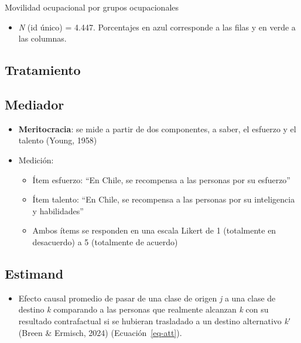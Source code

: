 \documentclass[
  spanish,
  letterpaper,
  DIV=11,
  numbers=noendperiod,
  oneside]{scrartcl}
\providecommand{\tightlist}{%
  \setlength{\itemsep}{0pt}\setlength{\parskip}{0pt}}
\begin{document}
\begin{table}

\caption{\label{tbl-ocup}Movilidad ocupacional por grupos ocupacionales}

\centering{

}

\end{table}%

\begin{itemize}
\tightlist
\item
  \emph{N} (id único) = 4.447. Porcentajes en azul corresponde a las
  filas y en verde a las columnas.
\end{itemize}

\subsection{Tratamiento}\label{tratamiento-2}

\subsection{Mediador}\label{mediador}

\begin{itemize}
\item
  \textbf{Meritocracia}: se mide a partir de dos componentes, a saber,
  el esfuerzo y el talento (Young, 1958)
\item
  Medición:

  \begin{itemize}
  \tightlist
  \item
    Ítem esfuerzo: ``En Chile, se recompensa a las personas por su
    esfuerzo''
  \item
    Ítem talento: ``En Chile, se recompensa a las personas por su
    inteligencia y habilidades''
  \item
    Ambos ítems se responden en una escala Likert de 1 (totalmente en
    desacuerdo) a 5 (totalmente de acuerdo)
  \end{itemize}
\end{itemize}

\subsection{Estimand}\label{estimand}

\begin{itemize}
\tightlist
\item
  Efecto causal promedio de pasar de una clase de origen \emph{j} a una
  clase de destino \emph{k} comparando a las personas que realmente
  alcanzan \emph{k} con su resultado contrafactual si se hubieran
  trasladado a un destino alternativo \emph{k′} (Breen \& Ermisch, 2024)
  (Ecuación~\ref{eq-att}).
\end{itemize}
\end{document}
